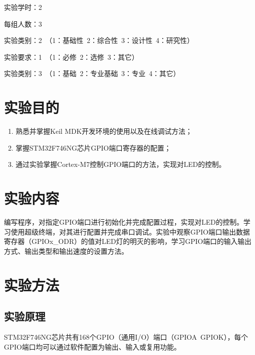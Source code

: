 ﻿\documentclass[UTF8,12pt]{article}
\newcommand\myemptypage{
    \null
    \thispagestyle{empty}
    \addtocounter{page}{-1}
    \newpage
}
\begin{document}
\begin{titlepage}
    
\end{titlepage}

\myemptypage

\begin{center}
    \tableofcontents
\end{center}

\newpage


实验学时：2

每组人数：3

实验类别：2\ （1：基础性\ 2：综合性\ 3：设计性\ 4：研究性）

实验要求：1\ （1：必修\ 2：选修\ 3：其它）

实验类别：3\ （1：基础\ 2：专业基础\ 3：专业\ 4：其它）

\section{实验目的}
\begin{enumerate}
    \item 熟悉并掌握Keil MDK开发环境的使用以及在线调试方法；
    \item 掌握STM32F746NG芯片GPIO端口寄存器的配置；
    \item 通过实验掌握Cortex-M7控制GPIO端口的方法，实现对LED的控制。
\end{enumerate}

\section{实验内容}
编写程序，对指定GPIO端口进行初始化并完成配置过程，实现对LED的控制。学习使用超级终端，对其进行配置并完成串口调试。实验中观察GPIO端口输出数据寄存器（GPIOx\_ODR）的值对LED灯的明灭的影响，学习GPIO端口的输入输出方式、输出类型和输出速度的设置方法。

\section{实验方法}

\subsection{实验原理}
STM32F746NG芯片共有168个GPIO（通用I/O）端口（GPIOA~GPIOK），每个GPIO端口均可以通过软件配置为输出、输入或复用功能。
\end{document}
